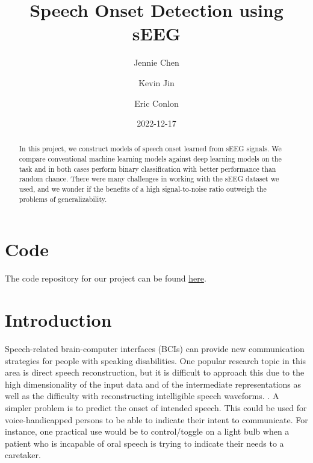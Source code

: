 \documentclass[format=sigconf, nonacm=true, review=false, screen=true]{acmart}
\title{Speech Onset Detection using sEEG}
\author{Jennie Chen}
\author{Kevin Jin}
\author{Eric Conlon}
\date{2022-12-17}
\begin{document}
\begin{abstract}

In this project, we construct models of speech onset learned from sEEG signals. We compare conventional machine learning models against deep learning models on the task and in both cases perform binary classification with better performance than random chance. There were many challenges in working with the sEEG dataset we used, and we wonder if the benefits of a high signal-to-noise ratio outweigh the problems of generalizability.

\end{abstract}

\maketitle
\section*{Code}
The code repository for our project can be found  \href{https://github.com/ejconlon/biosignals}{here}.

\section{Introduction}

Speech-related brain-computer interfaces (BCIs) can provide new communication strategies for people with speaking disabilities. One popular research topic in this area is direct speech reconstruction, but it is difficult to approach this due to the high dimensionality of the input data and of the intermediate representations as well as the difficulty with reconstructing intelligible speech waveforms. \cite{saha2019deep}. A simpler problem is to predict the onset of intended speech. This could be used for voice-handicapped persons to be able to indicate their intent to communicate. For instance, one practical use would be to control/toggle on a light bulb when a patient who is incapable of oral speech is trying to indicate their needs to a caretaker.
\end{document}
